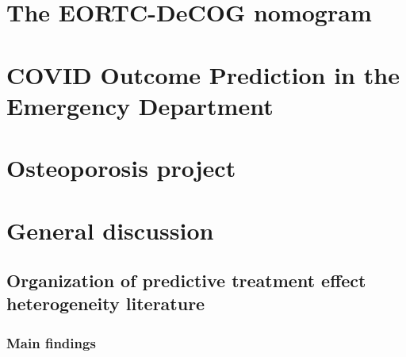 \documentclass[
]{book}
\begin{document}
\vspace*{\fill}\par
\pagebreak

\hypertarget{the-eortc-decog-nomogram}{%
\chapter{The EORTC-DeCOG nomogram}\label{the-eortc-decog-nomogram}}

\vspace*{\fill}\par
\pagebreak

\lipsum[1-4]

\hypertarget{covid-outcome-prediction-in-the-emergency-department}{%
\chapter{COVID Outcome Prediction in the Emergency Department}\label{covid-outcome-prediction-in-the-emergency-department}}

\vspace*{\fill}\par
\pagebreak

\lipsum[1-4]

\hypertarget{osteoporosis-project}{%
\chapter{Osteoporosis project}\label{osteoporosis-project}}

\hypertarget{discussion}{%
\chapter{General discussion}\label{discussion}}

\vspace*{\fill}\par 
\pagebreak

\hypertarget{organization-of-predictive-treatment-effect-heterogeneity-literature}{%
\section{Organization of predictive treatment effect heterogeneity literature}\label{organization-of-predictive-treatment-effect-heterogeneity-literature}}

\hypertarget{main-findings}{%
\subsection{Main findings}\label{main-findings}}
\end{document}
